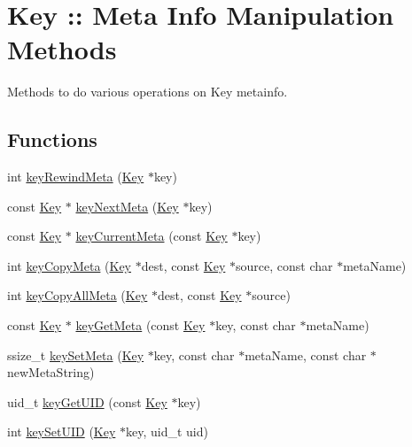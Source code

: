 \hypertarget{group__keymeta}{
\section{Key :: Meta Info Manipulation Methods}
\label{group__keymeta}
}


Methods to do various operations on Key metainfo.  


\subsection*{Functions}
\begin{DoxyCompactItemize}
\item 
int \hyperlink{group__keymeta_ga5dbb669802eea27e106ee3a5e39717a9}{keyRewindMeta} (\hyperlink{struct__Key}{Key} $\ast$key)
\item 
const \hyperlink{struct__Key}{Key} $\ast$ \hyperlink{group__keymeta_ga4c88342f580a4291455a801af71ce048}{keyNextMeta} (\hyperlink{struct__Key}{Key} $\ast$key)
\item 
const \hyperlink{struct__Key}{Key} $\ast$ \hyperlink{group__keymeta_ga74a273f529030f4947df52e14fdd2869}{keyCurrentMeta} (const \hyperlink{struct__Key}{Key} $\ast$key)
\item 
int \hyperlink{group__keymeta_ga9a22b992478e613c8788bd460b4a1f0c}{keyCopyMeta} (\hyperlink{struct__Key}{Key} $\ast$dest, const \hyperlink{struct__Key}{Key} $\ast$source, const char $\ast$metaName)
\item 
int \hyperlink{group__keymeta_ga8e63720a65610a29597494d0671f9401}{keyCopyAllMeta} (\hyperlink{struct__Key}{Key} $\ast$dest, const \hyperlink{struct__Key}{Key} $\ast$source)
\item 
const \hyperlink{struct__Key}{Key} $\ast$ \hyperlink{group__keymeta_ga9ed3875495ddb3d8a8d29158a60a147c}{keyGetMeta} (const \hyperlink{struct__Key}{Key} $\ast$key, const char $\ast$metaName)
\item 
ssize\_\-t \hyperlink{group__keymeta_gae1f15546b234ffb6007d8a31178652b9}{keySetMeta} (\hyperlink{struct__Key}{Key} $\ast$key, const char $\ast$metaName, const char $\ast$newMetaString)
\item 
uid\_\-t \hyperlink{group__keymeta_gacaa5060e67b03f50ae49a3620c54bc46}{keyGetUID} (const \hyperlink{struct__Key}{Key} $\ast$key)
\item 
int \hyperlink{group__keymeta_gab5f284f5ecd261e0a290095f50ba1af7}{keySetUID} (\hyperlink{struct__Key}{Key} $\ast$key, uid\_\-t uid)

\end{DoxyCompactItemize}
